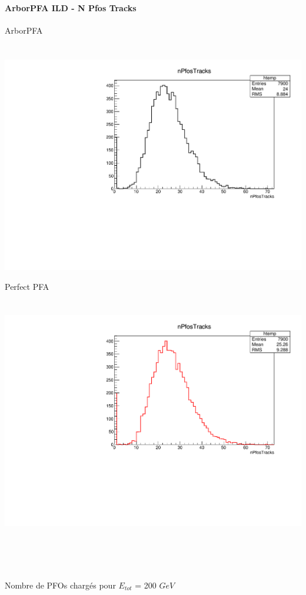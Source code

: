 \documentclass[8pt]{beamer}
\begin{document}
  \begin{frame}
  \frametitle{\backup}
  \framesubtitle{ArborPFA ILD - N Pfos Tracks}
    \begin{minipage}{0.48\linewidth}
      \begin{center}
        ArborPFA \\
        ~ \\
        ~~~~~\includegraphics[width=\linewidth]{nPfosTracks_ArborPFA.pdf}
      \end{center}
    \end{minipage}
    \begin{minipage}{0.48\linewidth}
      \begin{center}
        Perfect PFA \\
        ~ \\
        ~~~~~\includegraphics[width=\linewidth]{nPfosTracks_PerfectPFA.pdf}
      \end{center}
    \end{minipage}
    ~ \\
    ~ \\
    ~ \\
    \begin{center} Nombre de PFOs chargés pour $E_{tot}$ = 200 $GeV$ \end{center}
  \end{frame}
\end{document}
